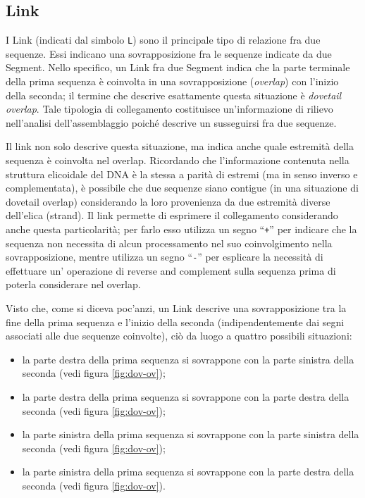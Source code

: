 \subsection{Link}
\label{sec:link}
I Link (indicati dal simbolo \texttt{L}) sono il principale
tipo di relazione fra due sequenze. Essi
indicano una sovrapposizione fra le sequenze indicate da due Segment.
Nello specifico, un Link fra due Segment indica che la parte terminale
della prima sequenza è coinvolta in una sovrapposizione (\emph{overlap})
con l'inizio della seconda; il termine che descrive esattamente questa situazione
è \emph{dovetail overlap}. Tale tipologia di collegamento costituisce
un'informazione di rilievo nell'analisi dell'assemblaggio poiché descrive
un susseguirsi fra due sequenze.

Il link non solo descrive questa situazione, ma indica anche quale
estremità della sequenza è coinvolta nel overlap. Ricordando che
l'informazione contenuta nella struttura elicoidale del DNA è la stessa a parità
di estremi (ma in senso inverso e complementata), è possibile
che due sequenze siano contigue (in una situazione di dovetail
overlap) considerando la loro provenienza da due estremità
diverse dell'elica (strand).
Il link permette di esprimere il collegamento considerando anche questa
particolarità; per farlo esso utilizza un segno ``\texttt{+}'' per indicare
che la sequenza non necessita di alcun processamento nel suo
coinvolgimento nella sovrapposizione, mentre utilizza un segno ``\texttt{-}''
per esplicare la necessità di effettuare un' operazione di reverse
and complement sulla sequenza prima di poterla considerare
nel overlap.

Visto che, come si diceva poc'anzi, un Link descrive una sovrapposizione
tra la fine della prima sequenza e l'inizio della seconda (indipendentemente
dai segni associati alle due sequenze coinvolte), ciò da luogo a quattro
possibili situazioni:
\begin{itemize}
	\item la parte destra della prima sequenza si sovrappone con la parte
		sinistra della seconda (vedi figura \ref{fig:dov-ov});
	\item la parte destra della prima sequenza si sovrappone con la parte
		destra della seconda (vedi figura \ref{fig:dov-ov});
	\item la parte sinistra della prima sequenza si sovrappone con la parte
		sinistra della seconda (vedi figura \ref{fig:dov-ov});
	\item la parte sinistra della prima sequenza si sovrappone con la parte
		destra della seconda (vedi figura \ref{fig:dov-ov}).
\end{itemize}

